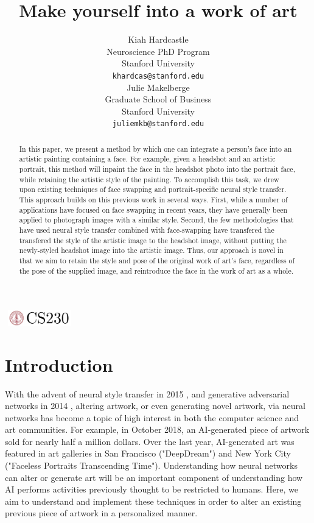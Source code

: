 \documentclass{article}
\title{Make yourself into a work of art}
\author{
  Kiah Hardcastle \\
  Neuroscience PhD Program \\
  Stanford University\\
  \texttt{khardcas@stanford.edu} \\
   \And
  Julie Makelberge \\
  Graduate School of Business \\
  Stanford University \\
  \texttt{juliemkb@stanford.edu} \\
}
\begin{document}

\begin{center}
\includegraphics[width=3cm, height=0.7cm]{CS230}
\end{center}

\maketitle

\begin{abstract}
In this paper, we present a method by which one can integrate a person's face into an artistic painting containing a face. For example, given a headshot and an artistic portrait, this method will inpaint the face in the headshot photo into the portrait face, while retaining the artistic style of the painting. To accomplish this task, we drew upon existing techniques of face swapping and portrait-specific neural style transfer. This approach builds on this previous work in several ways. First, while a number of applications have focused on face swapping in recent years, they have generally been applied to photograph images with a similar style. Second, the few methodologies that have used neural style transfer combined with face-swapping have transfered the transfered the style of the artistic image to the headshot image, without putting the newly-styled headshot image into the artistic image. Thus, our approach is novel in that we aim to retain the style and pose of the original work of art's face, regardless of the pose of the supplied image, and  reintroduce the face in the work of art as a whole. 
\end{abstract}

\section{Introduction}  
With the advent of neural style transfer in 2015 \cite{gatys2015neural}, and generative adversarial networks in 2014 \cite{gan2014}, altering artwork, or even generating novel artwork, via neural networks has become a topic of high interest in both the computer science and art communities. For example, in October 2018, an AI-generated piece of artwork sold for nearly half a million dollars. Over the last year, AI-generated art was featured in art galleries in San Francisco ("DeepDream") and New York City ("Faceless Portraits Transcending Time"). Understanding how neural networks can alter or generate art will be an important component of understanding how AI performs activities previously thought to be restricted to humans. Here, we aim to understand and implement these techniques in order to alter an existing previous piece of artwork in a personalized manner. 
\end{document}
